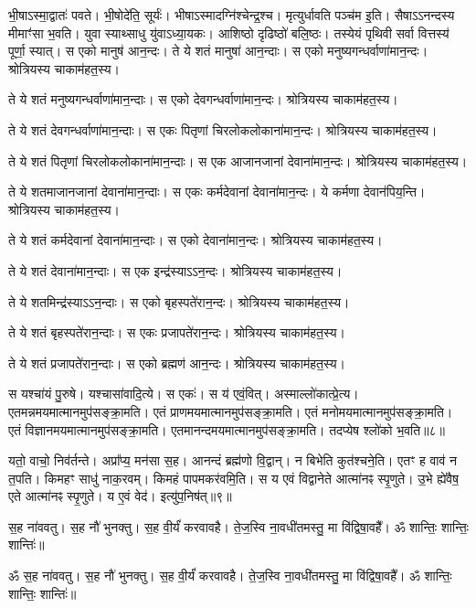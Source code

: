 भी॒षाऽस्मा॒द्वातः॑ पवते। 
भी॒षोदे॑ति॒ सूर्यः॑। 
भीषाऽस्मादग्नि॑\-श्चेन्द्र॒श्च। 
मृत्युर्धावति पञ्च॑म इ॒ति। 
सैषाऽऽनन्दस्य मीमाꣳ॑सा भ॒वति। 
युवा स्याथ्साधु यु॑वाऽध्या॒यकः। 
आशिष्ठो दृढिष्ठो॑ बलि॒ष्ठः। 
तस्येयं पृथिवी सर्वा वित्तस्य॑ पूर्णा॒ स्यात्। 
स एको मानुष॑ आन॒न्दः। 
ते ये शतं मानुषा॑ आन॒न्दाः। 
स एको मनुष्यगन्धर्वाणा॑\-मान॒न्दः। 
श्रोत्रियस्य चाकाम॑हत॒स्य। 

ते ये शतं मनुष्यगन्धर्वाणा॑मान॒न्दाः। 
स एको देवगन्धर्वाणा॑\-मान॒न्दः। 
श्रोत्रियस्य चाकाम॑हत॒स्य। 

ते ये शतं देवगन्धर्वाणा॑मान॒न्दाः। 
स एकः पितृणां चिरलोकलोकाना॑\-मान॒न्दः। 
श्रोत्रियस्य चाकाम॑हत॒स्य। 

ते ये शतं पितृणां चिरलोकलोकाना॑\-मान॒न्दाः। 
स एक आजानजानां देवाना॑\-मान॒न्दः। 
श्रोत्रियस्य चाकाम॑हत॒स्य। 

ते ये शतमाजानजानां देवाना॑मान॒न्दाः। 
स एकः कर्मदेवानां देवाना॑\-मान॒न्दः। 
ये कर्मणा देवान॑पिय॒न्ति। 
श्रोत्रियस्य चाकाम॑हत॒स्य। 

ते ये शतं कर्मदेवानां देवाना॑मान॒न्दाः। 
स एको देवाना॑\-मान॒न्दः। 
श्रोत्रियस्य चाकाम॑हत॒स्य। 

ते ये शतं देवाना॑मान॒न्दाः। 
स एक इन्द्र॑स्याऽऽन॒न्दः। 
श्रोत्रियस्य चाकाम॑हत॒स्य। 

ते ये शतमिन्द्र॑स्याऽऽन॒न्दाः। 
स एको बृहस्पते॑रान॒न्दः। 
श्रोत्रियस्य चाकाम॑हत॒स्य। 

ते ये शतं बृहस्पते॑रान॒न्दाः। 
स एकः प्रजापते॑रान॒न्दः। 
श्रोत्रियस्य चाकाम॑हत॒स्य। 

ते ये शतं प्रजापते॑रान॒न्दाः। 
स एको ब्रह्मण॑ आन॒न्दः। 
श्रोत्रियस्य चाकाम॑हत॒स्य। 

स यश्चा॑यं पु॒रुषे। 
यश्चासा॑वादि॒त्ये। 
स एकः॑। 
स य॑ एवं॒वित्। 
अस्माल्लो॑कात्प्रे॒त्य। 
एतमन्नमयमात्मानमुप॑सङ्क्रा॒मति। 
एतं प्राणमयमात्मानमुप॑सङ्क्रा॒मति। 
एतं मनोमयमात्मानमुप॑\-सङ्क्रा॒मति। 
एतं विज्ञानमयमात्मानमुप॑\-सङ्क्रा॒मति। 
एतमानन्द\-मयमात्मानमुप॑\-सङ्क्रा॒मति। 
तदप्येष श्लो॑को भ॒वति॥८॥

यतो॒ वाचो॒ निव॑र्तन्ते। 
अप्रा᳚प्य॒ मन॑सा स॒ह। 
आनन्दं ब्रह्म॑णो वि॒द्वान्। 
न बिभेति कुत॑श्चने॒ति। 
एतꣳ ह वाव॑ न त॒पति। 
किमहꣳ साधु॑ नाक॒रवम्। 
किमहं पापमकर॑वमि॒ति। 
स य एवं विद्वानेते आत्मा॑नꣴ स्पृ॒णुते। 
उ॒भे ह्ये॑वैष॒ एते आत्मा॑नꣴ स्पृ॒णुते। 
य ए॒वं वेद॑। 
इत्यु॑प॒निष॑त्॥९॥

स॒ह ना॑ववतु। 
स॒ह नौ॑ भुनक्तु। 
स॒ह वी॒र्यं॑ करवावहै। 
ते॒ज॒स्वि ना॒वधी॑तमस्तु॒ मा वि॑द्विषा॒वहै᳚। 
ॐ शान्तिः॒ शान्तिः॒ शान्तिः॑॥

\setcounter{anuvakam}{0}
ॐ स॒ह ना॑ववतु। 
स॒ह नौ॑ भुनक्तु। 
स॒ह वी॒र्यं॑ करवावहै। 
ते॒ज॒स्वि ना॒वधी॑तमस्तु॒ मा वि॑द्विषा॒वहै᳚। 
ॐ शान्तिः॒ शान्तिः॒ शान्तिः॑॥


